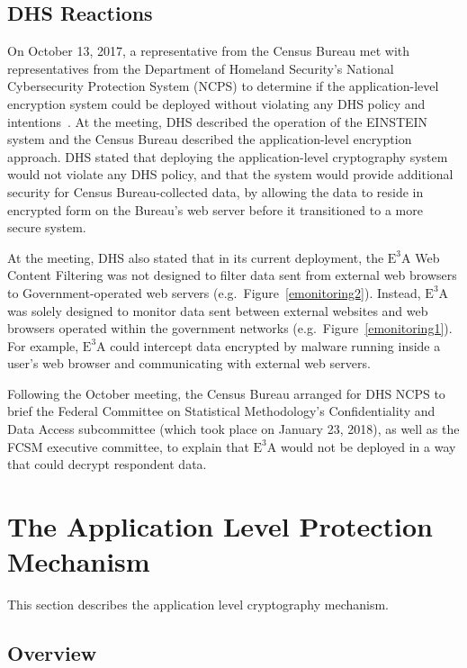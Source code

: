 \documentclass[fleqn,12pt]{wlscirep}
\newcommand{\ETA}{$\textrm{E}^\textrm{3}\textrm{A}$\xspace}
\begin{document}
\subsection{DHS Reactions}

On October 13, 2017, a representative from the Census Bureau met with
representatives from the Department of Homeland Security's National
Cybersecurity Protection System (NCPS) to determine if the
application-level encryption system could be deployed without
violating any DHS policy and intentions~\cite{garfinkel-notes}. At the meeting, DHS
described the operation of the EINSTEIN system and the Census Bureau
described the application-level encryption approach. DHS stated that
deploying the application-level cryptography system would not violate
any DHS policy, and that the system
would provide additional security for Census Bureau-collected data, by
allowing the data to reside in encrypted form on the Bureau's web
server before it transitioned to a more secure system.

At the meeting, DHS also stated that in its current deployment, the \ETA Web Content Filtering
was not designed to filter data sent from external web browsers to
Government-operated web servers (e.g.~Figure~\ref{emonitoring2}). Instead, \ETA was solely designed to
monitor data sent between external websites and web browsers operated
within the government networks (e.g.~Figure~\ref{emonitoring1}). For example, \ETA could intercept data
encrypted by malware running inside a user's web browser and
communicating with external web servers.

Following the October meeting, the Census Bureau arranged for DHS NCPS
to brief the Federal Committee on Statistical Methodology's
Confidentiality and Data Access subcommittee (which took place on
January 23, 2018), as well as the FCSM executive committee, to explain
that \ETA would not be deployed in a way that could decrypt respondent data.

\section{The Application Level Protection Mechanism}

This section describes the application level cryptography mechanism.

\subsection{Overview}
\end{document}
